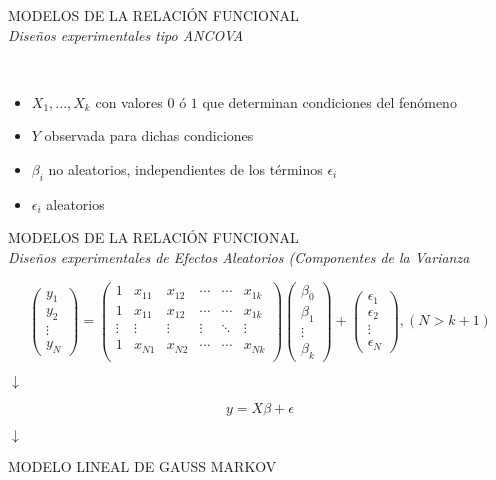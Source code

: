 \documentclass[10pt,a4paper]{book}
\begin{document}
\begin{center}
MODELOS DE LA RELACIÓN FUNCIONAL\\
\textit{Diseños experimentales tipo ANCOVA}
\end{center}
\ \\
\begin{itemize}
\item $X_1,...,X_k$ con valores $0$ ó $1$ que determinan condiciones del fenómeno
\item $Y$ observada para dichas condiciones
\item $\beta_i$ no aleatorios, independientes de los términos $\epsilon_i$
\item $\epsilon_i$ aleatorios
\end{itemize}
\begin{center}
MODELOS DE LA RELACIÓN FUNCIONAL\\
\textit{Diseños experimentales de Efectos Aleatorios (Componentes de la Varianza}
\end{center}
\newpage
$$ \left( \begin{array}{c}
y_1\\
y_2\\
\vdots\\
y_N \end{array} \right) = 
\left( \begin{array}{cccccc}
1 & x_{11} & x_{12} & \cdots & \cdots & x_{1k} \\
1 & x_{11} & x_{12} & \cdots & \cdots & x_{1k} \\
\vdots & \vdots & \vdots & \vdots & \ddots & \vdots \\
1 & x_{N1} & x_{N2} & \cdots & \cdots & x_{Nk} \\
\end{array} \right) 
\left( \begin{array}{c}
\beta_0\\
\beta_1\\
\vdots\\
\beta_k \end{array} \right) + 
\left( \begin{array}{c}
\epsilon_1\\
\epsilon_2\\
\vdots\\
\epsilon_N \end{array} \right),(N > k + 1)$$
\begin{center}
$ \downarrow $
\end{center}
$$y = X\beta + \epsilon$$
\begin{center}
$ \downarrow $
\end{center}
\begin{center}
MODELO LINEAL DE GAUSS MARKOV
\end{center}
\end{document}
